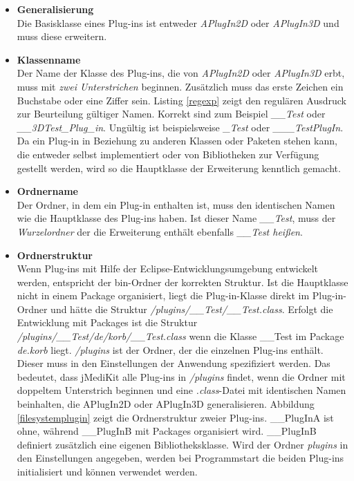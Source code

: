 \begin{itemize}
\item \textbf{Generalisierung}\\
Die Basisklasse eines Plug-ins ist entweder \textit{APlugIn2D} oder \textit{APlugIn3D} und muss diese erweitern. 
\item \textbf{Klassenname}\\
Der Name der Klasse des Plug-ins, die von \textit{APlugIn2D} oder \textit{APlugIn3D} erbt, muss mit \textit{zwei Unterstrichen} beginnen. Zusätzlich muss das erste Zeichen ein Buchstabe oder eine Ziffer sein. Listing \ref{regexp} zeigt den regulären Ausdruck zur Beurteilung gültiger Namen. Korrekt sind zum Beispiel \textit{\_\_Test} oder \textit{\_\_3DTest\_Plug\_in}. Ungültig ist beispielsweise \textit{\_Test} oder \textit{\_\_\_TestPlugIn}.
Da ein Plug-in in Beziehung zu anderen Klassen oder Paketen stehen kann, die entweder selbst implementiert oder von Bibliotheken zur Verfügung gestellt werden, wird so die Hauptklasse der Erweiterung kenntlich gemacht.
\item \textbf{Ordnername}\\
Der Ordner, in dem ein Plug-in enthalten ist, muss den identischen Namen wie die Hauptklasse des Plug-ins haben. Ist dieser Name \textit{\_\_Test}, muss der \textit{Wurzelordner} der die Erweiterung enthält ebenfalls \textit{\_\_Test heißen}.
\item \textbf{Ordnerstruktur}\\
Wenn Plug-ins mit Hilfe der Eclipse-Entwicklungsumgebung entwickelt werden, entspricht der bin-Ordner der korrekten Struktur. Ist die Hauptklasse nicht in einem Package organisiert, liegt die Plug-in-Klasse direkt im Plug-in-Ordner und hätte die Struktur \textit{/plugins/\_\_Test/\_\_Test.class}. Erfolgt die Entwicklung mit Packages ist die Struktur \textit{/plugins/\_\_Test/de/korb/\_\_Test.class} wenn die Klasse \_\_Test im Package \textit{de.korb} liegt. \textit{/plugins} ist der Ordner, der die einzelnen Plug-ins enthält. Dieser muss in den Einstellungen der Anwendung spezifiziert werden. Das bedeutet, dass jMediKit alle Plug-ins in \textit{/plugins} findet, wenn die Ordner mit doppeltem Unterstrich beginnen und eine \textit{.class}-Datei mit identischen Namen beinhalten, die APlugIn2D oder APlugIn3D generalisieren. Abbildung \ref{filesystemplugin} zeigt die Ordnerstruktur zweier Plug-ins. \_\_PlugInA ist ohne, während \_\_PlugInB mit Packages organisiert wird. \_\_PlugInB definiert zusätzlich eine eigenen Bibliotheksklasse. Wird der Ordner \textit{plugins} in den Einstellungen angegeben, werden bei Programmstart die beiden Plug-ins initialisiert und können verwendet werden.
\end{itemize}

